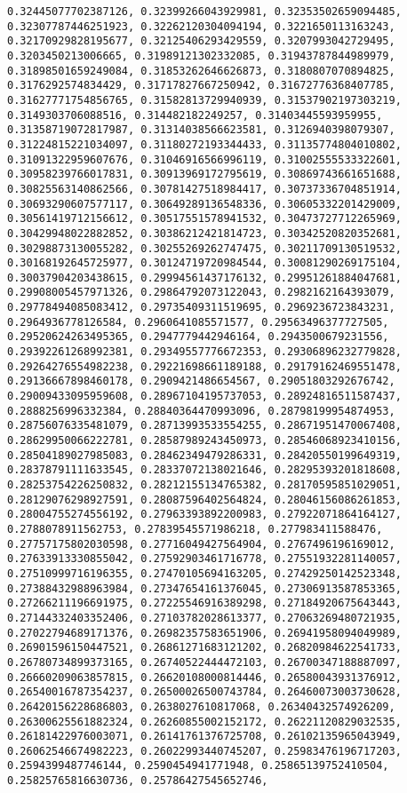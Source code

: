 \documentclass[11pt]{article}
\begin{document}
\begin{Verbatim}[commandchars=\\\{\}]
0.32445077702387126, 0.32399266043929981, 0.32353502659094485, 0.32307787446251923, 0.32262120304094194, 0.3221650113163243, 0.32170929828195677, 0.32125406293429559, 0.3207993042729495, 0.3203450213006665, 0.31989121302332085, 0.31943787844989979, 0.31898501659249084, 0.31853262646626873, 0.3180807070894825, 0.3176292574834429, 0.31717827667250942, 0.31672776368407785, 0.31627771754856765, 0.31582813729940939, 0.31537902197303219, 0.3149303706088516, 0.314482182249257, 0.31403445593959955, 0.31358719072817987, 0.31314038566623581, 0.3126940398079307, 0.31224815221034097, 0.31180272193344433, 0.31135774804010802, 0.31091322959607676, 0.31046916566996119, 0.31002555533322601, 0.30958239766017831, 0.30913969172795619, 0.30869743661651688, 0.30825563140862566, 0.30781427518984417, 0.30737336704851914, 0.30693290607577117, 0.30649289136548336, 0.30605332201429009, 0.30561419712156612, 0.30517551578941532, 0.30473727712265969, 0.30429948022882852, 0.30386212421814723, 0.30342520820352681, 0.30298873130055282, 0.30255269262747475, 0.30211709130519532, 0.30168192645725977, 0.30124719720984544, 0.30081290269175104, 0.30037904203438615, 0.29994561437176132, 0.29951261884047681, 0.29908005457971326, 0.29864792073122043, 0.2982162164393079, 0.29778494085083412, 0.29735409311519695, 0.2969236723843231, 0.2964936778126584, 0.2960641085571577, 0.29563496377727505, 0.29520624263495365, 0.2947779442946164, 0.2943500679231556, 0.29392261268992381, 0.29349557776672353, 0.29306896232779828, 0.29264276554982238, 0.29221698661189188, 0.29179162469551478, 0.29136667898460178, 0.2909421486654567, 0.29051803292676742, 0.29009433095959608, 0.28967104195737053, 0.28924816511587437, 0.2888256996332384, 0.28840364470993096, 0.28798199954874953, 0.28756076335481079, 0.28713993533554255, 0.28671951470067408, 0.28629950066222781, 0.28587989243450973, 0.28546068923410156, 0.28504189027985083, 0.28462349479286331, 0.28420550199649319, 0.28378791111633545, 0.28337072138021646, 0.28295393201818608, 0.28253754226250832, 0.28212155134765382, 0.28170595851029051, 0.28129076298927591, 0.28087596402564824, 0.28046156086261853, 0.28004755274556192, 0.27963393892200983, 0.27922071864164127, 0.2788078911562753, 0.27839545571986218, 0.277983411588476, 0.27757175802030598, 0.27716049427564904, 0.2767496196169012, 0.27633913330855042, 0.27592903461716778, 0.27551932281140057, 0.27510999716196355, 0.27470105694163205, 0.27429250142523348, 0.27388432988963984, 0.27347654161376045, 0.27306913587853365, 0.27266211196691975, 0.27225546916389298, 0.27184920675643443, 0.27144332403352406, 0.27103782028613377, 0.27063269480721935, 0.27022794689171376, 0.26982357583651906, 0.26941958094049989, 0.26901596150447521, 0.26861271683121202, 0.26820984622541733, 0.26780734899373165, 0.26740522444472103, 0.26700347188887097, 0.26660209063857815, 0.26620108000814446, 0.26580043931376912, 0.26540016787354237, 0.26500026500743784, 0.26460073003730628, 0.26420156228686803, 0.2638027610817068, 0.26340432574926209, 0.26300625561882324, 0.26260855002152172, 0.26221120829032535, 0.26181422976003071, 0.26141761376725708, 0.26102135965043949, 0.26062546674982223, 0.26022993440745207, 0.25983476196717203, 0.2594399487746144, 0.2590454941771948, 0.25865139752410504, 0.25825765816630736, 0.25786427545652746, 
\end{Verbatim}
\end{document}
